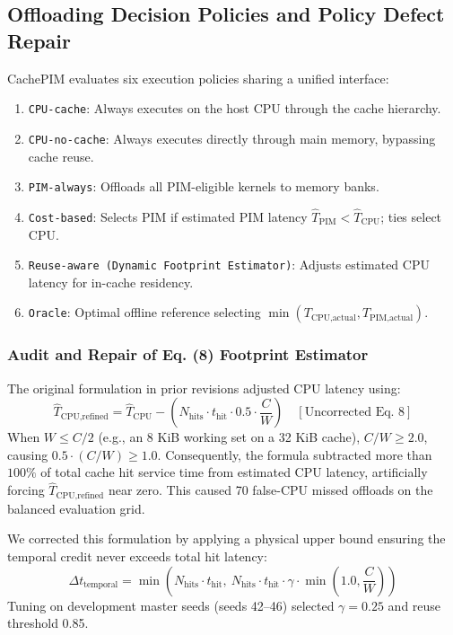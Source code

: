 \documentclass[journal,10pt,twocolumn]{IEEEtran}
\begin{document}
\subsection{Offloading Decision Policies and Policy Defect Repair}
CachePIM evaluates six execution policies sharing a unified interface:
\begin{enumerate}
    \item \texttt{CPU-cache}: Always executes on the host CPU through the cache hierarchy.
    \item \texttt{CPU-no-cache}: Always executes directly through main memory, bypassing cache reuse.
    \item \texttt{PIM-always}: Offloads all PIM-eligible kernels to memory banks.
    \item \texttt{Cost-based}: Selects PIM if estimated PIM latency $\hat{T}_{\text{PIM}} < \hat{T}_{\text{CPU}}$; ties select CPU.
    \item \texttt{Reuse-aware (Dynamic Footprint Estimator)}: Adjusts estimated CPU latency for in-cache residency.
    \item \texttt{Oracle}: Optimal offline reference selecting $\min(T_{\text{CPU,actual}}, T_{\text{PIM,actual}})$.
\end{enumerate}

\subsubsection{Audit and Repair of Eq. (8) Footprint Estimator}
The original formulation in prior revisions adjusted CPU latency using:
\begin{equation*}
\hat{T}_{\text{CPU,refined}} = \hat{T}_{\text{CPU}} - \left(N_{\text{hits}} \cdot t_{\text{hit}} \cdot 0.5 \cdot \frac{C}{W}\right) \quad [\text{Uncorrected Eq. 8}]
\end{equation*}
When $W \le C/2$ (e.g., an 8 KiB working set on a 32 KiB cache), $C/W \ge 2.0$, causing $0.5 \cdot (C/W) \ge 1.0$. Consequently, the formula subtracted more than $100\%$ of total cache hit service time from estimated CPU latency, artificially forcing $\hat{T}_{\text{CPU,refined}}$ near zero. This caused 70 false-CPU missed offloads on the balanced evaluation grid.

We corrected this formulation by applying a physical upper bound ensuring the temporal credit never exceeds total hit latency:
\begin{equation}
\Delta t_{\text{temporal}} = \min\left(N_{\text{hits}} \cdot t_{\text{hit}},\ N_{\text{hits}} \cdot t_{\text{hit}} \cdot \gamma \cdot \min\left(1.0, \frac{C}{W}\right)\right)
\end{equation}
Tuning on development master seeds (seeds 42--46) selected $\gamma = 0.25$ and reuse threshold 0.85.
\end{document}
